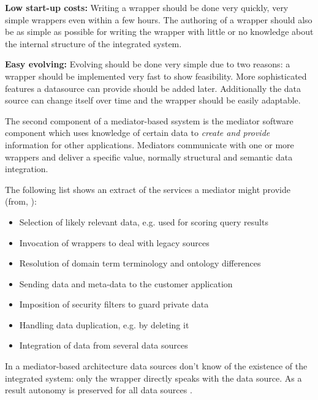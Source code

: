 \textbf{Low start-up costs:} Writing a wrapper should be done very quickly, very simple wrappers even within a few hours. The authoring of a wrapper should also be as simple as possible for writing the wrapper with little or no knowledge about the internal structure of the integrated system.

\textbf{Easy evolving:} Evolving should be done very simple due to two reasons: a wrapper should be implemented very fast to show feasibility. More sophisticated features a datasource can provide should be added later. Additionally the data source can change itself over time and the wrapper should be easily adaptable. 


The second component of a mediator-based ssystem is the mediator software component which uses knowledge of certain data to \textit{create and provide} information for other applications. Mediators communicate with one or more wrappers and deliver a specific value, normally structural and semantic data integration.

The following list shows an extract of the services a mediator might provide (from, \cite[p. 5-6]{Wiederhold1996TheCB}): 
\begin{itemize}
\item Selection of likely relevant data, e.g. used for scoring query results
\item Invocation of wrappers to deal with legacy sources
\item Resolution of domain term	terminology and ontology differences
\item Sending data and meta-data to the customer application
\item Imposition of security filters to guard private data
\item Handling data duplication, e.g. by deleting it
\item Integration of data from several data sources
\end{itemize}

In a mediator-based architecture data sources don't know of the existence of the integrated system: only the wrapper directly speaks with the data source. As a result autonomy is preserved for all data sources \cite[p. 97]{DBLP:books/dp/LeserN2006}.



